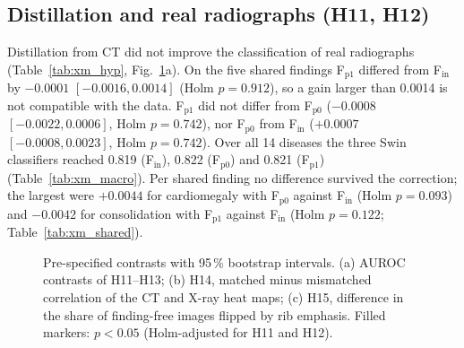 \subsection{Distillation and real radiographs (H11, H12)}
\label{sec:xm_res_h11}
Distillation from CT did not improve the classification of real radiographs (Table~\ref{tab:xm_hyp}, Fig.~\ref{fig:xm_forest}a). On the
five shared findings F$_\mathrm{p1}$ differed from F$_\mathrm{in}$ by $-0.0001$ $[-0.0016, 0.0014]$ (Holm $p=0.912$), so a gain larger
than 0.0014 is not compatible with the data. F$_\mathrm{p1}$ did not differ from F$_\mathrm{p0}$ ($-0.0008$ $[-0.0022, 0.0006]$, Holm
$p=0.742$), nor F$_\mathrm{p0}$ from F$_\mathrm{in}$ ($+0.0007$ $[-0.0008, 0.0023]$, Holm $p=0.742$). Over all 14 diseases the three Swin
classifiers reached 0.819 (F$_\mathrm{in}$), 0.822 (F$_\mathrm{p0}$) and 0.821 (F$_\mathrm{p1}$) (Table~\ref{tab:xm_macro}). Per shared
finding no difference survived the correction; the largest were $+0.0044$ for cardiomegaly with F$_\mathrm{p0}$ against F$_\mathrm{in}$
(Holm $p=0.093$) and $-0.0042$ for consolidation with F$_\mathrm{p1}$ against F$_\mathrm{in}$ (Holm $p=0.122$; Table~\ref{tab:xm_shared}).

\begin{table}[htbp]
\centering\footnotesize
\caption{Pre-specified hypotheses: differences of the seed ensembles with 95\,\% bootstrap intervals (\num{10000} resamples). Holm: H11
with the two H12 contrasts. The P0 row of H14 is descriptive.}
\label{tab:xm_hyp}
\end{table}

\begin{figure}[htbp]
\centering
{}
\caption{Pre-specified contrasts with 95\,\% bootstrap intervals. (a) AUROC contrasts of H11--H13; (b) H14, matched minus mismatched
correlation of the CT and X-ray heat maps; (c) H15, difference in the share of finding-free images flipped by rib emphasis. Filled
markers: $p<0.05$ (Holm-adjusted for H11 and H12).}
\label{fig:xm_forest}
\end{figure}

\begin{table}[htbp]
\centering\small
\caption{NIH test macro-AUROC of the seed ensembles over the 14 diseases and mean AUROC of the five shared findings (descriptive).}
\label{tab:xm_macro}
\end{table}

\begin{table}[htbp]
\centering\footnotesize
\caption{Shared findings on the NIH test split: AUROC of the seed ensembles and paired DeLong differences, Holm over the 15 tests
(descriptive).}
\label{tab:xm_shared}
\end{table}

